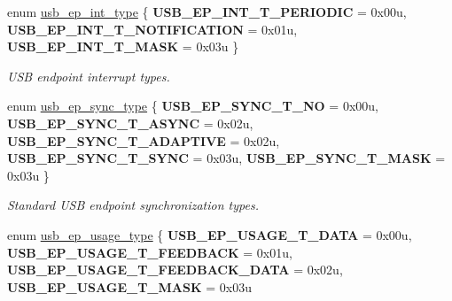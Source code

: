 \begin{DoxyCompactItemize}
\item 
\mbox{\label{group__usb__protocol__group_ga91299b3befbdb4075e84225376e6cc10}} 
enum \hyperlink{group__usb__protocol__group_ga91299b3befbdb4075e84225376e6cc10}{usb\+\_\+ep\+\_\+int\+\_\+type} \{ {\bfseries U\+S\+B\+\_\+\+E\+P\+\_\+\+I\+N\+T\+\_\+\+T\+\_\+\+P\+E\+R\+I\+O\+D\+IC} = 0x00u, 
{\bfseries U\+S\+B\+\_\+\+E\+P\+\_\+\+I\+N\+T\+\_\+\+T\+\_\+\+N\+O\+T\+I\+F\+I\+C\+A\+T\+I\+ON} = 0x01u, 
{\bfseries U\+S\+B\+\_\+\+E\+P\+\_\+\+I\+N\+T\+\_\+\+T\+\_\+\+M\+A\+SK} = 0x03u
 \}\begin{DoxyCompactList}\small\item\em U\+SB endpoint interrupt types. \end{DoxyCompactList}
\item 
\mbox{\label{group__usb__protocol__group_ga417770fc2794ba8e170cfd9b291aecb4}} 
enum \hyperlink{group__usb__protocol__group_ga417770fc2794ba8e170cfd9b291aecb4}{usb\+\_\+ep\+\_\+sync\+\_\+type} \{ \newline
{\bfseries U\+S\+B\+\_\+\+E\+P\+\_\+\+S\+Y\+N\+C\+\_\+\+T\+\_\+\+NO} = 0x00u, 
{\bfseries U\+S\+B\+\_\+\+E\+P\+\_\+\+S\+Y\+N\+C\+\_\+\+T\+\_\+\+A\+S\+Y\+NC} = 0x02u, 
{\bfseries U\+S\+B\+\_\+\+E\+P\+\_\+\+S\+Y\+N\+C\+\_\+\+T\+\_\+\+A\+D\+A\+P\+T\+I\+VE} = 0x02u, 
{\bfseries U\+S\+B\+\_\+\+E\+P\+\_\+\+S\+Y\+N\+C\+\_\+\+T\+\_\+\+S\+Y\+NC} = 0x03u, 
\newline
{\bfseries U\+S\+B\+\_\+\+E\+P\+\_\+\+S\+Y\+N\+C\+\_\+\+T\+\_\+\+M\+A\+SK} = 0x03u
 \}\begin{DoxyCompactList}\small\item\em Standard U\+SB endpoint synchronization types. \end{DoxyCompactList}
\item 
\mbox{\label{group__usb__protocol__group_gad2b9705d36b9857068e21bcc1000733e}} 
enum \hyperlink{group__usb__protocol__group_gad2b9705d36b9857068e21bcc1000733e}{usb\+\_\+ep\+\_\+usage\+\_\+type} \{ {\bfseries U\+S\+B\+\_\+\+E\+P\+\_\+\+U\+S\+A\+G\+E\+\_\+\+T\+\_\+\+D\+A\+TA} = 0x00u, 
{\bfseries U\+S\+B\+\_\+\+E\+P\+\_\+\+U\+S\+A\+G\+E\+\_\+\+T\+\_\+\+F\+E\+E\+D\+B\+A\+CK} = 0x01u, 
{\bfseries U\+S\+B\+\_\+\+E\+P\+\_\+\+U\+S\+A\+G\+E\+\_\+\+T\+\_\+\+F\+E\+E\+D\+B\+A\+C\+K\+\_\+\+D\+A\+TA} = 0x02u, 
{\bfseries U\+S\+B\+\_\+\+E\+P\+\_\+\+U\+S\+A\+G\+E\+\_\+\+T\+\_\+\+M\+A\+SK} = 0x03u

\end{DoxyCompactItemize}
